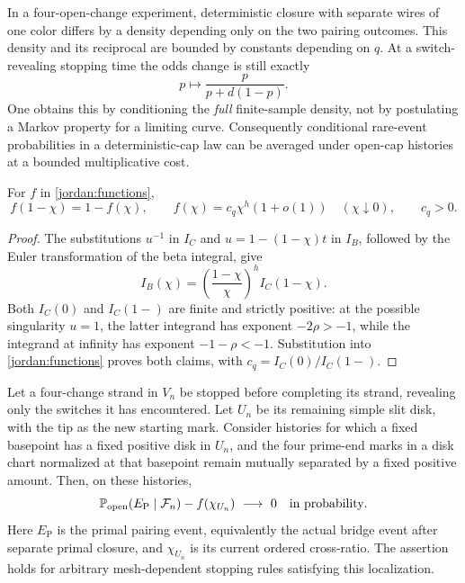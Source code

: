 In a four-open-change experiment, deterministic closure with separate
wires of one color differs by a density depending only on the two
pairing outcomes.  This density and its reciprocal are bounded by
constants depending on $q$.  At a switch-revealing stopping time the
odds change is still exactly
\begin{equation}\label{moving:odds}
 p\longmapsto \frac{p}{p+d(1-p)}.
\end{equation}
One obtains this by conditioning the \emph{full} finite-sample density,
not by postulating a Markov property for a limiting curve.  Consequently
conditional rare-event probabilities in a deterministic-cap law can
be averaged under open-cap histories at a bounded multiplicative cost.

\begin{lemma}\label{moving:asymptotic}
For $f$ in \eqref{jordan:functions},
\[
 f(1-\chi)=1-f(\chi),\qquad
 f(\chi)=c_q\chi^h(1+o(1))\quad(\chi\downarrow0),
 \qquad c_q>0.
\]
\end{lemma}
\begin{proof}
The substitutions $u^{-1}$ in $I_C$ and
$u=1-(1-\chi)t$ in $I_B$, followed by the Euler transformation of
the beta integral, give
\[
 I_B(\chi)=\left(\frac{1-\chi}{\chi}\right)^h I_C(1-\chi).
\]
Both $I_C(0)$ and $I_C(1-)$ are finite and strictly positive: at the
possible singularity $u=1$, the latter integrand has exponent
$-2\rho>-1$, while the integrand at infinity has exponent
$-1-\rho<-1$.  Substitution into \eqref{jordan:functions} proves both
claims, with $c_q=I_C(0)/I_C(1-)$.
\end{proof}

\begin{theorem}\label{moving:slit}
Let a four-change strand in $V_n$ be stopped before completing its
strand, revealing only the switches it has encountered.  Let $U_n$
be its remaining simple slit disk, with the tip as the new starting
mark.  Consider histories for which a fixed basepoint has a fixed
positive disk in $U_n$, and the four prime-end marks in a disk chart
normalized at that basepoint remain mutually separated by a fixed
positive amount.  Then, on these histories,
\begin{equation}\label{moving:limit}
 \mathbb P_{\mathrm{open}}(E_{\mathrm P}\mid\mathcal F_n)
       -f(\chi_{U_n})\ \longrightarrow\ 0
 \quad\hbox{in probability}.
\end{equation}
Here $E_{\mathrm P}$ is the primal pairing event, equivalently the
actual bridge event after separate primal closure, and $\chi_{U_n}$
is its current ordered cross-ratio.  The assertion holds for arbitrary
mesh-dependent stopping rules satisfying this localization.
\end{theorem}

